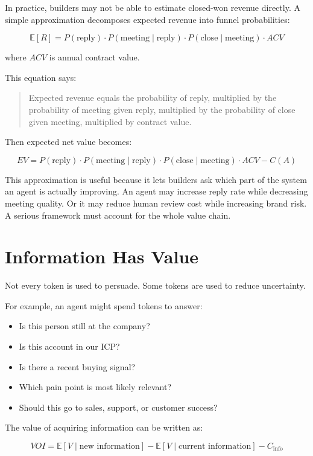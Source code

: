\documentclass[12pt]{article}
\begin{document}
In practice, builders may not be able to estimate closed-won revenue directly.
A simple approximation decomposes expected revenue into funnel probabilities:

\[
\mathbb{E}[R]
=
P(\text{reply})
\cdot
P(\text{meeting} \mid \text{reply})
\cdot
P(\text{close} \mid \text{meeting})
\cdot
ACV
\]

where \(ACV\) is annual contract value.

This equation says:

\begin{quote}
    Expected revenue equals the probability of reply, multiplied by the
    probability of meeting given reply, multiplied by the probability of close
    given meeting, multiplied by contract value.
\end{quote}

Then expected net value becomes:

\[
EV
=
P(\text{reply})
\cdot
P(\text{meeting} \mid \text{reply})
\cdot
P(\text{close} \mid \text{meeting})
\cdot
ACV
-
C(A)
\]

This approximation is useful because it lets builders ask which part of the
system an agent is actually improving. An agent may increase reply rate while
decreasing meeting quality. Or it may reduce human review cost while increasing
brand risk. A serious framework must account for the whole value chain.

\section{Information Has Value}

Not every token is used to persuade. Some tokens are used to reduce uncertainty.

For example, an agent might spend tokens to answer:

\begin{itemize}
    \item Is this person still at the company?
    \item Is this account in our ICP?
    \item Is there a recent buying signal?
    \item Which pain point is most likely relevant?
    \item Should this go to sales, support, or customer success?
\end{itemize}

The value of acquiring information can be written as:

\[
VOI
=
\mathbb{E}[V \mid \text{new information}]
-
\mathbb{E}[V \mid \text{current information}]
-
C_{\text{info}}
\]
\end{document}
